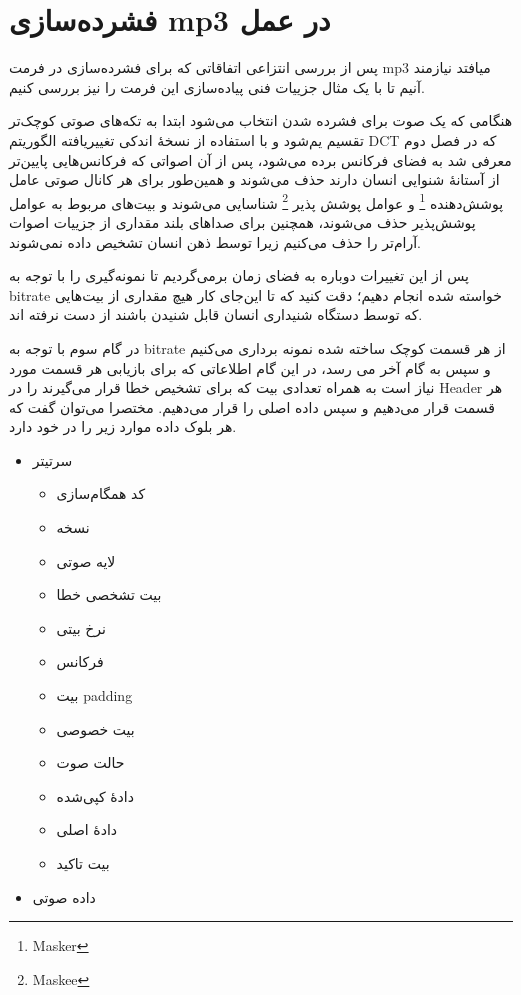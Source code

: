  \section{فشرده‌سازی mp3 در عمل}

 پس از بررسی انتزاعی اتفاقاتی که برای فشرده‌سازی در فرمت mp3 میافتد نیازمند آنیم تا 
 با یک مثال جزییات فنی پیاده‌سازی این فرمت را نیز بررسی کنیم. 

 هنگامی که یک صوت برای فشرده‌ شدن انتخاب می‌شود ابتدا به تکه‌های صوتی کوچک‌تر تقسیم یم‌شود و با استفاده از نسخهٔ اندکی تغییریافته الگوریتم DCT که در فصل 
 دوم معرفی شد به فضای فرکانس برده می‌شود، پس از آن اصواتی که فرکانس‌هایی پایین‌تر از آستانهٔ شنوایی انسان دارند حذف می‌شوند و همین‌طور برای
 هر کانال صوتی عامل 
 پوشش‌دهنده \footnote{Masker}
 و عوامل پوشش پذیر \footnote{Maskee}
 شناسایی می‌شوند و بیت‌های مربوط به عوامل پوشش‌پذیر حذف می‌شوند، همچنین برای صداهای بلند مقداری از جزییات اصوات آرام‌تر را حذف می‌کنیم زیرا
 توسط ذهن انسان تشخیص داده نمی‌شوند. 

  پس از این تغییرات دوباره به فضای زمان برمی‌گردیم تا نمونه‌گیری را با توجه به 
 bitrate خواسته شده انجام دهیم؛ دقت کنید که تا این‌جای کار هیچ مقداری از بیت‌هایی که توسط دستگاه شنیداری انسان قابل شنیدن باشند از دست نرفته اند.

 در گام سوم با توجه به bitrate از هر قسمت کوچک ساخته شده نمونه برداری می‌کنیم و سپس به گام آخر می رسد،
 در این گام اطلاعاتی که برای بازیابی هر قسمت مورد نیاز است به همراه تعدادی بیت که برای تشخیص خطا قرار می‌گیرند را در Header
 هر قسمت قرار می‌دهیم و سپس داده اصلی را قرار می‌دهیم. مختصرا می‌توان گفت که هر بلوک داده موارد زیر را در خود دارد. 

 \begin{itemize}
         \item سرتیتر
         \begin{itemize}
                 \item کد همگام‌سازی
                 \item نسخه
                 \item لایه صوتی
                 \item بیت تشخصی خطا
                 \item نرخ بیتی
                 \item فرکانس
                 \item بیت padding
                 \item بیت خصوصی
                 \item حالت صوت
                 \item دادهٔ کپی‌شده
                 \item دادهٔ اصلی
                 \item بیت تاکید
         \end{itemize}
         \item داده صوتی
 \end{itemize}

